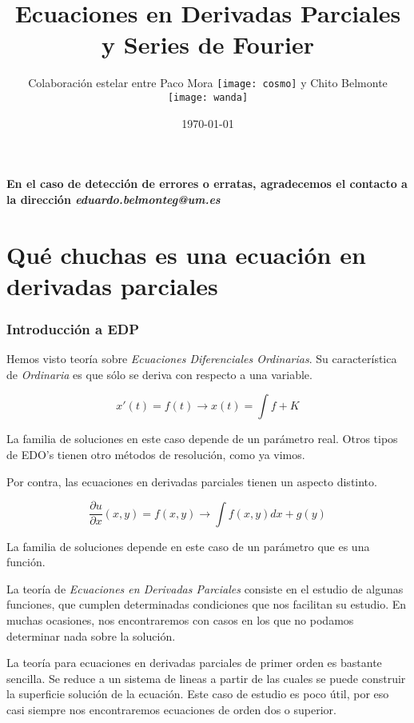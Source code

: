\documentclass[openany]{book}
\title{Ecuaciones en Derivadas Parciales y Series de Fourier}
\author{Colaboración estelar entre Paco Mora \texttt{[image: cosmo]} y Chito Belmonte \texttt{[image: wanda]}}
\date{\today}
\begin{document}
\maketitle

\tableofcontents

\textbf{En el caso de detección de errores o erratas, agradecemos el contacto a la dirección \textit{eduardo.belmonteg@um.es}}

\chapter{Qué chuchas es una ecuación en derivadas parciales} %

\subsection{Introducción a EDP}
\begin{minipage}[l]{0.6\textwidth}
  Hemos visto teoría sobre \textit{Ecuaciones Diferenciales Ordinarias}. Su característica de \textit{Ordinaria} es que sólo se deriva con respecto a una variable.
\end{minipage}
\begin{minipage}[l]{0.4\textwidth}
  $$ x'(t)=f(t) \to x(t) = \int f + K $$
\end{minipage}

La familia de soluciones en este caso depende de un parámetro real. Otros tipos de EDO's tienen otro métodos de resolución, como ya vimos.

\begin{minipage}[l]{0.5\textwidth}
  Por contra, las ecuaciones en derivadas parciales tienen un aspecto distinto.
\end{minipage}
\begin{minipage}[l]{0.5\textwidth}
  $$ \dfrac{\partial u}{\partial x}(x,y)=f(x,y) \to \int f(x,y)dx +g(y) $$
\end{minipage}

La familia de soluciones depende en este caso de un parámetro que es una función.

La teoría de \textit{Ecuaciones en Derivadas Parciales} consiste en el estudio de algunas funciones, que cumplen determinadas condiciones que nos facilitan su estudio. En muchas ocasiones, nos encontraremos con casos en los que no podamos determinar nada sobre la solución.

La teoría para ecuaciones en derivadas parciales de primer orden es bastante sencilla. Se reduce a un sistema de lineas a partir de las cuales se puede construir la superficie solución de la ecuación. Este caso de estudio es poco útil, por eso casi siempre nos encontraremos ecuaciones de orden dos o superior.
\end{document}
